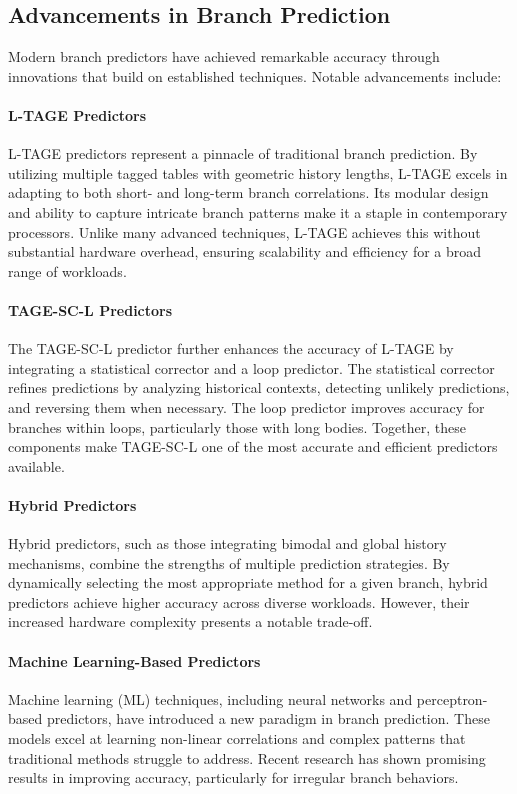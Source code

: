 \documentclass[10pt,journal,compsoc]{IEEEtran}
\begin{document}
\subsection*{Advancements in Branch Prediction}

Modern branch predictors have achieved remarkable accuracy through innovations that build on established techniques. Notable advancements include:

\paragraph*{L-TAGE Predictors} L-TAGE predictors represent a pinnacle of traditional branch prediction. By utilizing multiple tagged tables with geometric history lengths, L-TAGE excels in adapting to both short- and long-term branch correlations. Its modular design and ability to capture intricate branch patterns make it a staple in contemporary processors. Unlike many advanced techniques, L-TAGE achieves this without substantial hardware overhead, ensuring scalability and efficiency for a broad range of workloads.

\paragraph*{TAGE-SC-L Predictors} The TAGE-SC-L predictor further enhances the accuracy of L-TAGE by integrating a statistical corrector and a loop predictor. The statistical corrector refines predictions by analyzing historical contexts, detecting unlikely predictions, and reversing them when necessary. The loop predictor improves accuracy for branches within loops, particularly those with long bodies. Together, these components make TAGE-SC-L one of the most accurate and efficient predictors available.

\paragraph*{Hybrid Predictors} Hybrid predictors, such as those integrating bimodal and global history mechanisms, combine the strengths of multiple prediction strategies. By dynamically selecting the most appropriate method for a given branch, hybrid predictors achieve higher accuracy across diverse workloads. However, their increased hardware complexity presents a notable trade-off.

\paragraph*{Machine Learning-Based Predictors} Machine learning (ML) techniques, including neural networks and perceptron-based predictors, have introduced a new paradigm in branch prediction. These models excel at learning non-linear correlations and complex patterns that traditional methods struggle to address. Recent research has shown promising results in improving accuracy, particularly for irregular branch behaviors.
\end{document}
